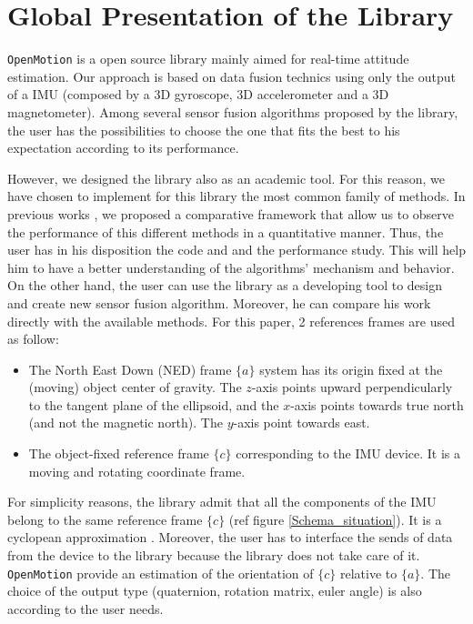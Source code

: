 
\section{Global Presentation of the Library}

\texttt{OpenMotion} is a open source library mainly aimed for real-time attitude estimation. Our approach is based on data fusion technics using only the output of a IMU (composed by a 3D gyroscope,  3D accelerometer and a 3D magnetometer). Among several sensor fusion algorithms proposed by the library, the user has the possibilities to choose the one that fits the best to his expectation according to its performance. 

However, we designed the library also as an academic tool. For this reason, we have chosen to implement for this library the most common family of methods. In previous works \cite{braudcomparison}, we proposed a comparative framework that allow us to observe the performance of this different methods in a quantitative manner. Thus, the user has in his disposition the code and and the performance study. This will help him to have a better understanding of the algorithms' mechanism and behavior. On the other hand, the user can use the library as a developing tool to design and create new sensor fusion algorithm. Moreover, he can compare his work directly with the available methods. For this paper,  2 references frames are used as follow:


\vspace{0.1cm}

\begin{itemize}
\item The North East Down (NED) frame $\{a\}$ system has its origin fixed at the (moving) object center of gravity. The $z$-axis points upward perpendicularly to the tangent plane of the ellipsoid, and the $x$-axis points towards true north (and not the magnetic north). The $y$-axis point towards east.

\vspace{0.1cm}

\item The object-fixed reference frame $\{c\}$ corresponding to the IMU device. It is a moving and rotating coordinate frame. 
\end{itemize}

\vspace{0.1cm}

For simplicity reasons, the library admit that all the components of the IMU belong to the same reference frame $\{c\}$ (ref figure \ref{Schema_situation}). It is a cyclopean approximation \cite{ouarti2008multimodal}. Moreover, the user has to interface the sends of data from the device to the library because the library does not take care of it. \texttt{OpenMotion} provide an estimation of the orientation of $\{c\}$ relative to $\{a\}$. The choice of the output type (quaternion, rotation matrix, euler angle) is also according to the user needs. 

